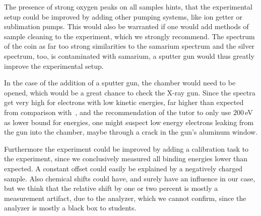 \documentclass[a4paper,10pt]{scrartcl}
\begin{document}
The presence of strong oxygen peaks on all samples hints, that the experimental setup could be improved by adding other pumping systems, like ion getter or sublimation pumps. This would also be warranted if one would add methods of sample cleaning to the experiment, which we strongly recommend. The spectrum of the coin as far too strong similarities to the samarium spectrum and the silver spectrum, too, is contaminated with samarium, a sputter gun would thus greatly improve the experimental setup.

In the case of the addition of a sputter gun, the chamber would need to be opened, which would be a great chance to check the X-ray gun. Since the spectra get very high for electrons with low kinetic energies, far higher than expected from comparison with~\cite{handbook}, and the recommendation of the tutor to only use $200\,$eV as lower bound for energies, one might suspect low energy electrons leaking from the gun into the chamber, maybe through a crack in the gun's aluminum window.

Furthermore the experiment could be improved by adding a calibration task to the experiment, since we conclusively measured all binding energies lower than expected. A constant offset could easily be explained by a negatively charged sample. Also chemical shifts could have, and surely have an influence in our case, but we think that the relative shift by one or two percent is mostly a measurement artifact, due to the analyzer, which we cannot confirm, since the analyzer is mostly a black box to students.

\nocite{skript}
\nocite{handbook}
\nocite{booklet}
\nocite{nist}
\nocite{book}
\nocite{bank}



\end{document}
